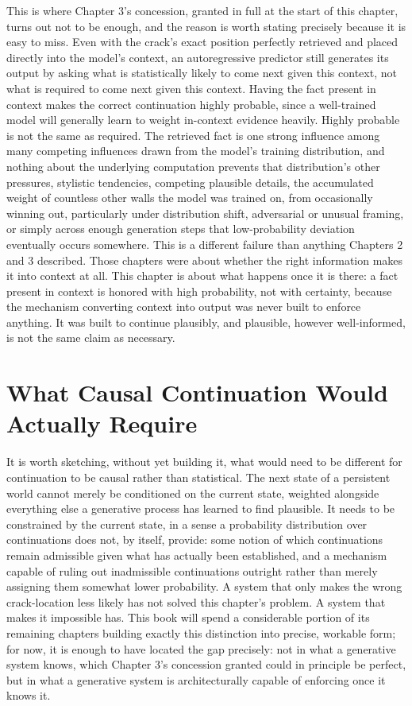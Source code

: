 This is where Chapter 3's concession, granted in full at the start of this chapter, turns out not to be enough, and the reason is worth stating precisely because it is easy to miss. Even with the crack's exact position perfectly retrieved and placed directly into the model's context, an autoregressive predictor still generates its output by asking what is statistically likely to come next given this context, not what is required to come next given this context. Having the fact present in context makes the correct continuation highly probable, since a well-trained model will generally learn to weight in-context evidence heavily. Highly probable is not the same as required. The retrieved fact is one strong influence among many competing influences drawn from the model's training distribution, and nothing about the underlying computation prevents that distribution's other pressures, stylistic tendencies, competing plausible details, the accumulated weight of countless other walls the model was trained on, from occasionally winning out, particularly under distribution shift, adversarial or unusual framing, or simply across enough generation steps that low-probability deviation eventually occurs somewhere. This is a different failure than anything Chapters 2 and 3 described. Those chapters were about whether the right information makes it into context at all. This chapter is about what happens once it is there: a fact present in context is honored with high probability, not with certainty, because the mechanism converting context into output was never built to enforce anything. It was built to continue plausibly, and plausible, however well-informed, is not the same claim as necessary.

\section{What Causal Continuation Would Actually Require}

It is worth sketching, without yet building it, what would need to be different for continuation to be causal rather than statistical. The next state of a persistent world cannot merely be conditioned on the current state, weighted alongside everything else a generative process has learned to find plausible. It needs to be constrained by the current state, in a sense a probability distribution over continuations does not, by itself, provide: some notion of which continuations remain admissible given what has actually been established, and a mechanism capable of ruling out inadmissible continuations outright rather than merely assigning them somewhat lower probability. A system that only makes the wrong crack-location less likely has not solved this chapter's problem. A system that makes it impossible has. This book will spend a considerable portion of its remaining chapters building exactly this distinction into precise, workable form; for now, it is enough to have located the gap precisely: not in what a generative system knows, which Chapter 3's concession granted could in principle be perfect, but in what a generative system is architecturally capable of enforcing once it knows it.

